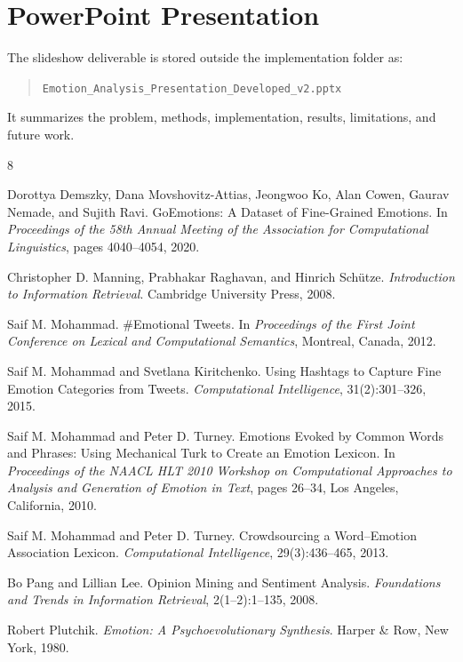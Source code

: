 \documentclass[11pt]{article}
\begin{document}
\section{PowerPoint Presentation}

The slideshow deliverable is stored outside the implementation folder as:

\begin{quote}
\texttt{Emotion\_Analysis\_Presentation\_Developed\_v2.pptx}
\end{quote}

It summarizes the problem, methods, implementation, results, limitations, and future work.

\begin{thebibliography}{8}

Dorottya Demszky, Dana Movshovitz-Attias, Jeongwoo Ko, Alan Cowen, Gaurav Nemade, and Sujith Ravi.
\newblock GoEmotions: A Dataset of Fine-Grained Emotions.
\newblock In \emph{Proceedings of the 58th Annual Meeting of the Association for Computational Linguistics}, pages 4040--4054, 2020.

Christopher D. Manning, Prabhakar Raghavan, and Hinrich Sch{\"u}tze.
\newblock \emph{Introduction to Information Retrieval}.
\newblock Cambridge University Press, 2008.

Saif M. Mohammad.
\newblock \#Emotional Tweets.
\newblock In \emph{Proceedings of the First Joint Conference on Lexical and Computational Semantics}, Montreal, Canada, 2012.

Saif M. Mohammad and Svetlana Kiritchenko.
\newblock Using Hashtags to Capture Fine Emotion Categories from Tweets.
\newblock \emph{Computational Intelligence}, 31(2):301--326, 2015.

Saif M. Mohammad and Peter D. Turney.
\newblock Emotions Evoked by Common Words and Phrases: Using Mechanical Turk to Create an Emotion Lexicon.
\newblock In \emph{Proceedings of the NAACL HLT 2010 Workshop on Computational Approaches to Analysis and Generation of Emotion in Text}, pages 26--34, Los Angeles, California, 2010.

Saif M. Mohammad and Peter D. Turney.
\newblock Crowdsourcing a Word--Emotion Association Lexicon.
\newblock \emph{Computational Intelligence}, 29(3):436--465, 2013.

Bo Pang and Lillian Lee.
\newblock Opinion Mining and Sentiment Analysis.
\newblock \emph{Foundations and Trends in Information Retrieval}, 2(1--2):1--135, 2008.

Robert Plutchik.
\newblock \emph{Emotion: A Psychoevolutionary Synthesis}.
\newblock Harper \& Row, New York, 1980.

\end{thebibliography}
\end{document}
